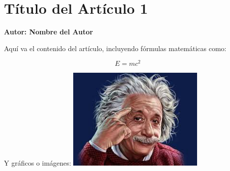 \section{Título del Artículo 1}
\textbf{Autor: Nombre del Autor}

Aquí va el contenido del artículo, incluyendo fórmulas matemáticas como:

\[
E = mc^2
\]

Y gráficos o imágenes:
\includegraphics[width=0.5\textwidth]{images/article1/image_einstein.jpg}

\newpage